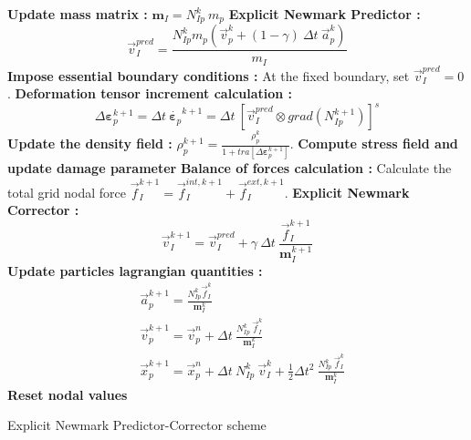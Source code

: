 \message{ !name(2020_EFM_MPM_Eigensoftening.tex)}\documentclass[preprint,12pt,a4paper]{elsarticle}
\newcommand{\tens}[1]{
  \ensuremath{\mathbf{{#1}}}
}
\newcommand\Grad[1]{grad({#1})}
\begin{document}
\begin{algorithm}[H]
  \DontPrintSemicolon
    \textbf{Update mass matrix :} $ \tens{m}_{I} = N_{Ip}^{k}\ m_p$ \;
    \textbf{Explicit Newmark Predictor :}
    \begin{equation*}
      \vec{v}_I^{pred} = \frac{ N_{Ip}^{k} m_p (\vec{v}_p^k + (1 - \gamma)\ \Delta t\ \vec{a}_p^k)}{m_I}
    \end{equation*}\;
    \textbf{Impose essential boundary conditions :} At the fixed
    boundary, set $\vec{v}_{I}^{pred} = 0$.\; 
    \textbf{Deformation tensor increment calculation :}
    \begin{equation*}
      \Delta \tens{\varepsilon}_{p}^{k+1} = \Delta t\
        \dot{\tens{\varepsilon}_{p}}^{k+1} = \Delta t\ \left[ \vec{v}_{I}^{pred} \otimes
        \Grad{N_{Ip}^{k+1}} \right]^s
    \end{equation*} \;
    \textbf{Update the density field :} $\rho_p^{k+1} =
    \frac{\rho_p^k}{1 + \mathit{tra}\left[\Delta\tens{\varepsilon}_{p}^{k+1}\right]}.$\;
    \textbf{Compute stress field and update damage parameter}\;
    \textbf{Balance of forces calculation :} Calculate the total grid
    nodal force $\vec{f}_{I}^{k+1} = \vec{f}_{I}^{int,k+1} + \vec{f}_{I}^{ext,k+1}$.\;
    \textbf{Explicit Newmark Corrector :}
    \begin{equation*}
      \vec{v}_{I}^{k+1} = \vec{v}_{I}^{pred} + \gamma\ \Delta t\ \frac{\vec{f}_{I}^{k+1}}{\tens{m}_I^{k+1}}  
    \end{equation*}\;
    \textbf{Update particles lagrangian quantities :}
    \begin{align*}
      &\vec{a}_p^{k+1} = \frac{N_{Ip}^k\vec{f}_{I}^{k}}{\tens{m}_I^k}\\
      &\vec{v}_p^{k+1} = \vec{v}_p^n + \Delta t\
        \frac{N_{Ip}^k\
        \vec{f}_{I}^{k}}{\tens{m}_I^k}\\
      &\vec{x}_p^{k+1} = \vec{x}_p^n + \Delta t\
         N_{Ip}^k\ \vec{v}_{I}^{k} +
        \frac{1}{2}\Delta t^2\ \frac{N_{Ip}^k\
        \vec{f}_{I}^{k}}{\tens{m}_I^k}
    \end{align*}\;
    \textbf{Reset nodal values}\;
    \label{alg-epc}
    \caption{Explicit Newmark Predictor-Corrector scheme}
\end{algorithm} 
\end{document}
